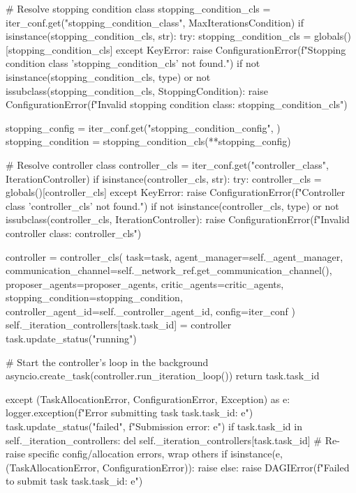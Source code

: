 \documentclass{amsbook}
\theoremstyle{definition}
\theoremstyle{remark}
\numberwithin{equation}{chapter} %
\begin{document}
\begin{python}
            # Resolve stopping condition class
            stopping_condition_cls = iter_conf.get("stopping_condition_class", MaxIterationsCondition)
            if isinstance(stopping_condition_cls, str):
                 try: stopping_condition_cls = globals()[stopping_condition_cls]
                 except KeyError: raise ConfigurationError(f"Stopping condition class '{stopping_condition_cls}' not found.")
            if not isinstance(stopping_condition_cls, type) or not issubclass(stopping_condition_cls, StoppingCondition):
                 raise ConfigurationError(f"Invalid stopping condition class: {stopping_condition_cls}")

            stopping_config = iter_conf.get("stopping_condition_config", {})
            stopping_condition = stopping_condition_cls(**stopping_config)

            # Resolve controller class
            controller_cls = iter_conf.get("controller_class", IterationController)
            if isinstance(controller_cls, str):
                 try: controller_cls = globals()[controller_cls]
                 except KeyError: raise ConfigurationError(f"Controller class '{controller_cls}' not found.")
            if not isinstance(controller_cls, type) or not issubclass(controller_cls, IterationController):
                 raise ConfigurationError(f"Invalid controller class: {controller_cls}")


            controller = controller_cls(
                task=task,
                agent_manager=self._agent_manager,
                communication_channel=self._network_ref.get_communication_channel(),
                proposer_agents=proposer_agents,
                critic_agents=critic_agents,
                stopping_condition=stopping_condition,
                controller_agent_id=self._controller_agent_id,
                config=iter_conf
            )
            self._iteration_controllers[task.task_id] = controller
            task.update_status("running")

            # Start the controller's loop in the background
            asyncio.create_task(controller.run_iteration_loop())
            return task.task_id

        except (TaskAllocationError, ConfigurationError, Exception) as e:
            logger.exception(f"Error submitting task {task.task_id}: {e}")
            task.update_status("failed", f"Submission error: {e}")
            if task.task_id in self._iteration_controllers: del self._iteration_controllers[task.task_id]
            # Re-raise specific config/allocation errors, wrap others
            if isinstance(e, (TaskAllocationError, ConfigurationError)): raise
            else: raise DAGIError(f"Failed to submit task {task.task_id}: {e}")



\end{python}
\end{document}
